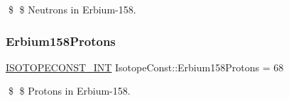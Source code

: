 \$ \$ Neutrons in Erbium-\/158. \mbox{\label{group___isotope_const-_erbium-_er158_ga806bddbf9e82021ad124c402aa8804e8}} 
\subsubsection{\texorpdfstring{Erbium158\+Protons}{Erbium158Protons}}
{\footnotesize\ttfamily \mbox{\hyperlink{group___isotope_const-_macros_ga5f18360b3e99483a35c32d789e62621c}{I\+S\+O\+T\+O\+P\+E\+C\+O\+N\+S\+T\+\_\+\+I\+NT}} Isotope\+Const\+::\+Erbium158\+Protons = 68}

\$ \$ Protons in Erbium-\/158. 